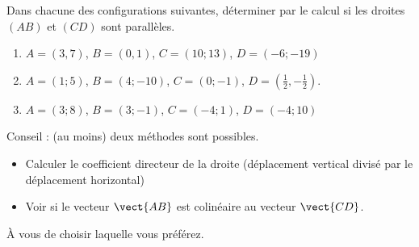 
\begin{exercice}\label{exosmath-0083}

    Dans chacune des configurations suivantes, déterminer par le calcul si les droites \( (AB)\) et \( (CD)\) sont parallèles.
    \begin{enumerate}
        \item
            \( A=(3,7)\), \( B=(0,1)\), \( C=(10;13)\), \( D=(-6;-19)\)
        \item
            \( A=(1;5)\), \( B=(4;-10)\), \( C=(0;-1)\), \( D=(\frac{ 1 }{2},-\frac{ 1 }{2})\).
        \item
            \( A=(3;8)\), \( B=(3;-1)\), \( C=(-4;1)\), \( D=(-4;10)\)
    \end{enumerate}
    Conseil : (au moins) deux méthodes sont possibles.
    \begin{itemize}
        \item Calculer le coefficient directeur de la droite (déplacement vertical divisé par le déplacement horizontal)
        \item Voir si le vecteur \( \vect{ AB } \) est colinéaire au vecteur \( \vect{ CD }\).
    \end{itemize}
    À vous de choisir laquelle vous préférez.

\end{exercice}
